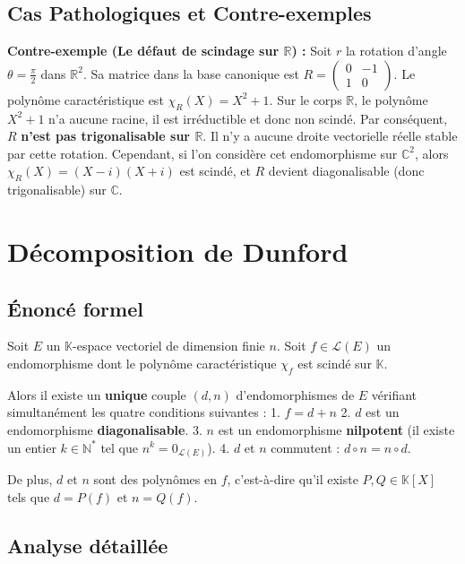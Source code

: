 \documentclass[11pt,a4paper]{article}
\begin{document}
\subsection{Cas Pathologiques et Contre-exemples}

\textbf{Contre-exemple (Le défaut de scindage sur $\mathbb{R}$) :}
Soit $r$ la rotation d'angle $\theta = \frac{\pi}{2}$ dans $\mathbb{R}^2$. Sa matrice dans la base canonique est $R = \begin{pmatrix} 0 & -1 \\ 1 & 0 \end{pmatrix}$.
Le polynôme caractéristique est $\chi_R(X) = X^2 + 1$.
Sur le corps $\mathbb{R}$, le polynôme $X^2 + 1$ n'a aucune racine, il est irréductible et donc non scindé.
Par conséquent, $R$ \textbf{n'est pas trigonalisable sur $\mathbb{R}$}. Il n'y a aucune droite vectorielle réelle stable par cette rotation. Cependant, si l'on considère cet endomorphisme sur $\mathbb{C}^2$, alors $\chi_R(X) = (X-i)(X+i)$ est scindé, et $R$ devient diagonalisable (donc trigonalisable) sur $\mathbb{C}$.

\section{Décomposition de Dunford}

\subsection{Énoncé formel}

Soit $E$ un $\mathbb{K}$-espace vectoriel de dimension finie $n$.
Soit $f \in \mathcal{L}(E)$ un endomorphisme dont le polynôme caractéristique $\chi_f$ est scindé sur $\mathbb{K}$.

Alors il existe un \textbf{unique} couple $(d, n)$ d'endomorphismes de $E$ vérifiant simultanément les quatre conditions suivantes :
1. $f = d + n$
2. $d$ est un endomorphisme \textbf{diagonalisable}.
3. $n$ est un endomorphisme \textbf{nilpotent} (il existe un entier $k \in \mathbb{N}^*$ tel que $n^k = 0_{\mathcal{L}(E)}$).
4. $d$ et $n$ commutent : $d \circ n = n \circ d$.

De plus, $d$ et $n$ sont des polynômes en $f$, c'est-à-dire qu'il existe $P, Q \in \mathbb{K}[X]$ tels que $d = P(f)$ et $n = Q(f)$.

\subsection{Analyse détaillée}
\end{document}
